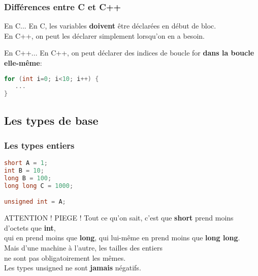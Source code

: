 \documentclass{beamer}
\begin{document}
\begin{frame}[fragile=singleslide,shrink=20]
\frametitle {Différences entre C et C++}

\begin{block}{En C...}
En C, les variables \textbf{doivent} être déclarées en début de bloc. \\
En C++, on peut les déclarer simplement lorsqu'on en a besoin.
\end{block}
\begin{block}{En C++...}
En C++, on peut déclarer des indices de boucle for \textbf{dans la boucle elle-même}:
\begin{lstlisting}[language=c++]
for (int i=0; i<10; i++) {
   ...
}
\end{lstlisting}
\end{block}
\end{frame}

\subsection{Les types de base}

\begin{frame}[fragile=singleslide,shrink=20]
\frametitle {Les types entiers}
\begin{lstlisting}[language=c++]
short A = 1;
int B = 10;
long B = 100;
long long C = 1000;

unsigned int = A;

\end{lstlisting}
\begin{block}{ATTENTION ! PIEGE !}
Tout ce qu'on sait, c'est que \textbf{short} prend moins d'octets que \textbf{int}, \\
qui en prend moins que \textbf{long}, qui lui-même en prend moins que \textbf{long long}. \\
Mais d'une machine à l'autre, les tailles des entiers \\ 
ne sont pas obligatoirement les mêmes. \\
Les types unsigned ne sont \textbf{jamais} négatifs.
\end{block}
\end{frame}
\end{document}
